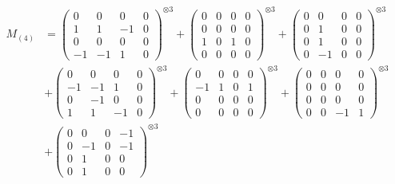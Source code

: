 \documentclass{article}
\newcommand{\Mthree}{%
    M_{(4)}
}
\begin{document}
        \newpage
        
        \footnotesize{
        \begin{align}
        \Mthree
        &= \label{Rs16-Rc11-Solution-22-c1} \begin{pmatrix} 0 & 0 & 0 & 0 \\ 1 & 1 & -1 & 0 \\ 0 & 0 & 0 & 0 \\ -1 & -1 & 1 & 0 \end{pmatrix}^{\otimes 3} 
            + \begin{pmatrix} 0 & 0 & 0 & 0 \\ 0 & 0 & 0 & 0 \\ 1 & 0 & 1 & 0 \\ 0 & 0 & 0 & 0 \end{pmatrix}^{\otimes 3} 
            + \begin{pmatrix} 0 & 0 & 0 & 0 \\ 0 & 1 & 0 & 0 \\ 0 & 1 & 0 & 0 \\ 0 & -1 & 0 & 0 \end{pmatrix}^{\otimes 3} \\
        &+ \label{Rs16-Rc11-Solution-22-c4} \begin{pmatrix} 0 & 0 & 0 & 0 \\ -1 & -1 & 1 & 0 \\ 0 & -1 & 0 & 0 \\ 1 & 1 & -1 & 0 \end{pmatrix}^{\otimes 3} 
            + \begin{pmatrix} 0 & 0 & 0 & 0 \\ -1 & 1 & 0 & 1 \\ 0 & 0 & 0 & 0 \\ 0 & 0 & 0 & 0 \end{pmatrix}^{\otimes 3} 
            + \begin{pmatrix} 0 & 0 & 0 & 0 \\ 0 & 0 & 0 & 0 \\ 0 & 0 & 0 & 0 \\ 0 & 0 & -1 & 1 \end{pmatrix}^{\otimes 3} \\
        &+ \label{Rs16-Rc11-Solution-22-c7} \begin{pmatrix} 0 & 0 & 0 & -1 \\ 0 & -1 & 0 & -1 \\ 0 & 1 & 0 & 0 \\ 0 & 1 & 0 & 0 \end{pmatrix}^{\otimes 3} 

\end{align}}
\end{document}
